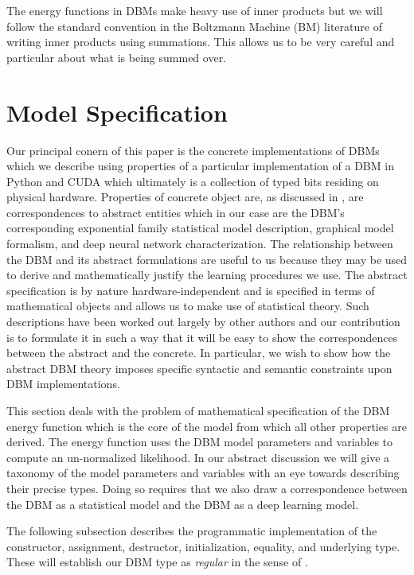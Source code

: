 \documentclass{article} %
\begin{document}
The energy functions in DBMs make heavy use of inner products but we
will follow the standard convention in the Boltzmann Machine (BM)
 literature of writing inner products using
summations.  This allows us to be very careful and particular about
what is being summed over.

\section{Model Specification}

Our principal conern of this paper is the concrete implementations of DBMs which we describe using properties of a particular
implementation of a DBM in Python and CUDA which ultimately is a collection of typed bits residing on physical hardware.  
Properties of concrete object are, as discussed in \cite[Chapter~1]{stepanov2009elements},
are correspondences
to abstract entities which in our case are the DBM's corresponding exponential family statistical
model description, graphical model formalism, and deep neural network characterization. The relationship between the DBM and its abstract
formulations are useful to us because 
they may be used to derive and mathematically justify the learning procedures we use.  The abstract 
specification is by nature hardware-independent and is specified in terms of mathematical objects and allows us to make use of 
statistical theory. Such descriptions have been worked out largely by other authors and our contribution is to formulate it
in such a way that it will be easy to show the correspondences between the abstract and the concrete.  In particular, we wish to show
how the abstract DBM theory imposes specific syntactic and semantic constraints upon DBM implementations. 

This section deals with the problem of mathematical specification of the DBM energy function which is the core of the model
from which all other properties are derived.  The energy function uses the DBM model parameters and variables to compute an un-normalized
likelihood.  In our abstract discussion we will give a taxonomy of the model parameters and variables with an eye towards
describing their precise types.  Doing so requires that we also draw a correspondence between the DBM as a statistical model
and the DBM as a deep learning model.

The following subsection describes the programmatic implementation of the constructor, assignment, destructor, initialization, equality,
and underlying type.  These will establish our DBM type as { \it regular} in the sense of \cite[Chapter~1]{stepanov2009elements}.
\end{document}
